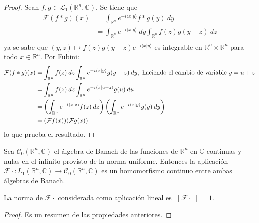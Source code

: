 \documentclass[12pt]{report}
\newcounter{it}
\theoremstyle{largebreak}
\newcommand\cf[3]{\ensuremath{#1:#2\rightarrow#3}}
\newcommand\norm[1]{\ensuremath{\|#1\|}}
\newcommand\pint[2]{\ensuremath{\langle#1| #2\rangle}}
\newcommand{\fou}[1]{\ensuremath{\mathcal{F}#1}}
\begin{document}
    \begin{proof}
        Sean $f,g\in\mathcal{L}_1(\mathbb{R}^n,\mathbb{C})$. Se tiene que
        \begin{equation*}
            \begin{split}
                \fou{(f*g)}(x)&=\int_{\mathbb{R}^n}e^{ -i\pint{x}{y}}f*g(y)\:dy\\
                &=\int_{\mathbb{R}^n}e^{ -i\pint{x}{y}}\:dy\int_{\mathbb{R}^n}f(z)g(y-z)\:dz\\
            \end{split}
        \end{equation*}
        ya se sabe que $(y,z)\mapsto f(z)g(y-z)e^{ -i\pint{x}{y}}$ es integrable en $\mathbb{R}^n\times\mathbb{R}^n$ para todo $x\in\mathbb{R}^n$. Por Fubini:
        \begin{equation*}
            \begin{split}
                \fou{(f*g)}(x)&=\int_{\mathbb{R}^n}f(z)\:dz\int_{\mathbb{R}^n}e^{ -i\pint{x}{y}}g(y-z)\:dy,\textup{ haciendo el cambio de variable }y=u+z\\
                &=\int_{\mathbb{R}^n}f(z)\:dz\int_{\mathbb{R}^n}e^{-i\pint{x}{u+z}}g(u)\:du\\
                &=\left(\int_{\mathbb{R}^n}e^{ -i\pint{x}{z}}f(z)\:dz \right)\left(\int_{\mathbb{R}^n}e^{ -i\pint{x}{y}}g(y)\:dy \right)\\
                &=(\fou{f}(x))(\fou{g}(x))\\
            \end{split}
        \end{equation*}
        lo que prueba el resultado.
    \end{proof}

    \begin{theor}
        Sea $\mathcal{C}_0(\mathbb{R}^n,\mathbb{C})$ el álgebra de Banach de las funciones de $\mathbb{R}^n$ en $\mathbb{C}$ continuas y nulas en el infinito provisto de la norma uniforme. Entonces la aplicación $\cf{\fou{\cdot}}{L_1(\mathbb{R}^n,\mathbb{C})}{\mathcal{C}_0(\mathbb{R}^n,\mathbb{C})}$ es un homomorfismo continuo entre ambas álgebras de Banach.

        La norma de $\fou{\cdot}$ considerada como aplicación lineal es $\norm{\fou{\cdot}}=1$.
    \end{theor}

    \begin{proof}
        Es un resumen de las propiedades anteriores.
    \end{proof}
\end{document}
